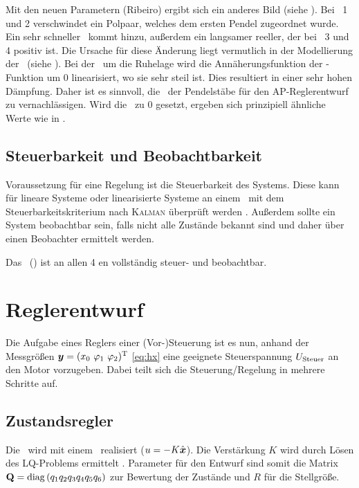 Mit den neuen Parametern (Ribeiro) ergibt sich ein anderes Bild (siehe ).
Bei \ap\ 1 und 2 verschwindet ein Polpaar, welches dem ersten Pendel zugeordnet wurde. Ein sehr schneller \ew\ kommt hinzu, außerdem ein langsamer reeller, der bei \ap\ 3 und 4 positiv ist. 
Die Ursache für diese Änderung liegt vermutlich in der Modellierung der \crb\ (siehe ). Bei der \lin\ um die Ruhelage wird die Annäherungsfunktion der -Funktion um 0 linearisiert, wo sie sehr steil ist. Dies resultiert in einer sehr hohen Dämpfung. Daher ist es sinnvoll, die \crb\ der Pendelstäbe für den AP-Reglerentwurf zu vernachlässigen.
Wird die \crb\ zu 0 gesetzt, ergeben sich prinzipiell ähnliche Werte wie in .


\subsection{Steuerbarkeit und Beobachtbarkeit}

Voraussetzung für eine Regelung ist die Steuerbarkeit des Systems. Diese kann für lineare Systeme oder linearisierte Systeme an einem \ap\ mit dem Steuerbarkeitskriterium nach \textsc{Kalman} überprüft werden \cite{AdamyRT2}. Außerdem sollte ein System beobachtbar sein, falls nicht alle Zustände bekannt sind und daher über einen Beobachter ermittelt werden.

Das \spds\ (\bss) ist an allen 4 \ap en vollständig steuer- und beobachtbar.


\section{Reglerentwurf}

Die Aufgabe eines Reglers \bzw einer (Vor-)Steuerung ist es nun, anhand der Messgrößen $\vey=(\xo\ \phe\ \phz)^{\transp}$ \eqref{eq:hx} eine geeignete Steuerspannung $U_{\mathrm{Steuer}}$ an den Motor vorzugeben. Dabei teilt sich die Steuerung/Regelung in mehrere Schritte auf. 


\subsection{Zustandsregler}\label{subsec:zsr} 

Die \aprg\ wird mit einem \zsr\ realisiert ($u=-K \hat{\boldsymbol{x}}$). Die Verstärkung $K$ wird durch Lösen des LQ-Problems ermittelt \cite{AdamyRT2}. Parameter für den Entwurf sind somit die Matrix ${\boldsymbol{\mathrm{Q}}}=\mathrm{diag} \, (q_1  q_2  q_3  q_4  q_5  q_6)$ zur Bewertung der Zustände und $R$ für die Stellgröße. 

